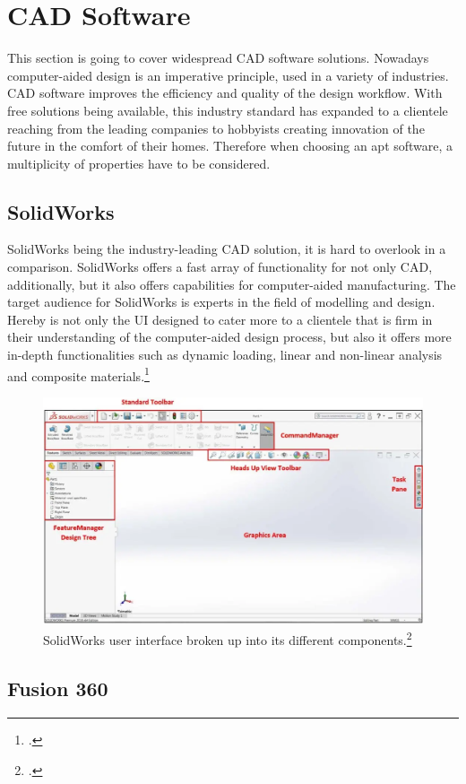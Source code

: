 \section{CAD Software}

This section is going to cover widespread CAD software solutions. Nowadays computer-aided design is an imperative principle, used in a variety of industries. CAD software improves the efficiency and quality of the design workflow. With free solutions being available, this industry standard has expanded to a clientele reaching from the leading companies to hobbyists creating innovation of the future in the comfort of their homes. Therefore when choosing an apt software, a multiplicity of properties have to be considered.

\subsection{SolidWorks}

SolidWorks being the industry-leading CAD solution, it is hard to overlook in a comparison. SolidWorks offers a fast array of functionality for not only CAD, additionally, but it also offers capabilities for computer-aided manufacturing. 
The target audience for SolidWorks is experts in the field of modelling and design. Hereby is not only the UI designed to cater more to a clientele that is firm in their understanding of the computer-aided design process, but also it offers more in-depth functionalities such as dynamic loading, linear and non-linear analysis and composite materials.\footcite{all3dpSolidWorksVsFusion2021}

\begin{figure}[h]
	\centering
	\includegraphics[width=0.6\linewidth]{img/SolidWorksUI}
	\caption{SolidWorks user interface broken up into its different components.\footcite{hawkridgesysUIBSolidWorks2019}}
	\label{fig:custom_parts_solidworks}
\end{figure}


\subsection{Fusion 360}

